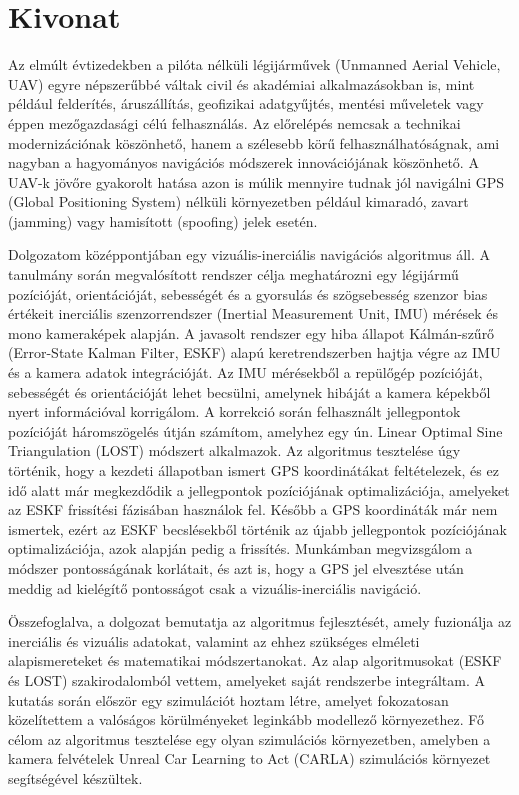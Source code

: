 \selecthungarian%
\chapter*{Kivonat}

Az elmúlt évtizedekben a pilóta nélküli légijárművek (Unmanned Aerial Vehicle, UAV) egyre népszerűbbé váltak civil és akadémiai alkalmazásokban is, mint például felderítés, áruszállítás, geofizikai adatgyűjtés, mentési műveletek vagy éppen mezőgazdasági célú felhasználás. Az előrelépés nemcsak a technikai modernizációnak köszönhető, hanem a szélesebb körű felhasználhatóságnak, ami nagyban a hagyományos navigációs módszerek innovációjának köszönhető. A UAV-k jövőre gyakorolt hatása azon is múlik mennyire tudnak jól navigálni GPS (Global Positioning System) nélküli környezetben például kimaradó, zavart (jamming) vagy hamisított (spoofing) jelek esetén.

Dolgozatom középpontjában egy vizuális-inerciális navigációs algoritmus áll. A tanulmány során megvalósított rendszer célja meghatározni egy légijármű pozícióját, orientációját, sebességét és a gyorsulás és szögsebesség szenzor bias értékeit inerciális szenzorrendszer (Inertial Measurement Unit, IMU) mérések és mono kameraképek alapján. A javasolt rendszer egy hiba állapot Kálmán-szűrő (Error-State Kalman Filter, ESKF) alapú keretrendszerben hajtja végre az IMU és a kamera adatok integrációját. Az IMU mérésekből a repülőgép pozícióját, sebességét és orientációját lehet becsülni, amelynek hibáját a kamera képekből nyert információval korrigálom. A korrekció során felhasznált jellegpontok pozícióját háromszögelés útján számítom, amelyhez egy ún. Linear Optimal Sine Triangulation (LOST) módszert alkalmazok. Az algoritmus tesztelése úgy történik, hogy a kezdeti állapotban ismert GPS koordinátákat feltételezek, és ez idő alatt már megkezdődik a jellegpontok pozíciójának optimalizációja, amelyeket az ESKF frissítési fázisában használok fel. Később a GPS koordináták már nem ismertek, ezért az ESKF becslésekből történik az újabb jellegpontok pozíciójának optimalizációja, azok alapján pedig a frissítés. Munkámban megvizsgálom a módszer pontosságának korlátait, és azt is, hogy a GPS jel elvesztése után meddig ad kielégítő pontosságot csak a vizuális-inerciális navigáció.

Összefoglalva, a dolgozat bemutatja az algoritmus fejlesztését, amely fuzionálja az inerciális és vizuális adatokat, valamint az ehhez szükséges elméleti alapismereteket és matematikai módszertanokat. Az alap algoritmusokat (ESKF és LOST) szakirodalomból vettem, amelyeket saját rendszerbe integráltam. A kutatás során először egy szimulációt hoztam létre, amelyet fokozatosan közelítettem a valóságos körülményeket leginkább modellező környezethez. Fő célom az algoritmus tesztelése egy olyan szimulációs környezetben, amelyben a kamera felvételek Unreal Car Learning to Act (CARLA) szimulációs környezet segítségével készültek.


